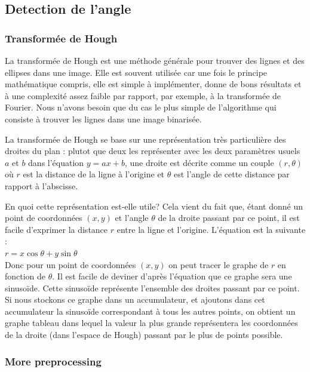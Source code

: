 \subsection{Detection de l'angle}
\subsubsection{Transformée de Hough}

La transformée de Hough est une méthode générale pour trouver des lignes et des ellipses dans une image. Elle est souvent utilisée car une fois le principe mathématique compris, elle est simple à implémenter, donne de bons résultats et à une complexité assez faible par rapport, par exemple, à la transformée de Fourier. Nous n'avons besoin que du cas le plus simple de l'algorithme qui consiste à trouver les lignes dans une image binarisée.

La transformée de Hough se base sur une représentation très particulière des droites du plan : plutot que deux les représenter avec les deux paramètres usuels $a$ et $b$ dans l'équation $y = ax + b$, une droite est décrite comme un couple $(r, \theta)$ où $r$ est la distance de la ligne à l'origine et $\theta$ est l'angle de cette distance par rapport à l'abscisse.

En quoi cette représentation est-elle utile? Cela vient du fait que, étant donné un point de coordonnées $(x, y)$ et l'angle $\theta$ de la droite passant par ce point, il est facile d'exprimer la distance $r$ entre la ligne et l'origine. L'équation est la suivante :\\
$r = x\cos\theta + y\sin\theta$\\
Donc pour un point de coordonnées $(x, y)$ on peut tracer le graphe de $r$ en fonction de $\theta$. Il est facile de deviner d'après l'équation que ce graphe sera une sinusoïde. Cette sinusoïde représente l'ensemble des droites passant par ce point. Si nous stockons ce graphe dans un accumulateur, et ajoutons dans cet accumulateur la sinusoïde correspondant à tous les autres points, on obtient un graphe tableau dans lequel la valeur la plus grande représentera les coordonnées de la droite (dans l'espace de Hough) passant par le plus de points possible.

\subsubsection{More preprocessing}

